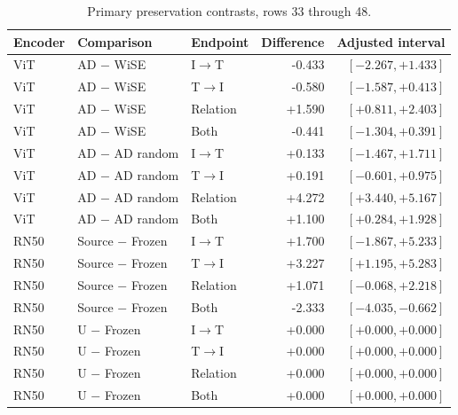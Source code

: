 \begin{table}[t]
\centering
\small
\setlength{\tabcolsep}{3pt}
\begin{tabular}{lllrr}
\toprule
Encoder & Comparison & Endpoint & Difference & Adjusted interval\\
\midrule
ViT & AD $-$ WiSE & I$\to$T & -0.433 & $[-2.267,+1.433]$ \\
ViT & AD $-$ WiSE & T$\to$I & -0.580 & $[-1.587,+0.413]$ \\
ViT & AD $-$ WiSE & Relation & +1.590 & $[+0.811,+2.403]$ \\
ViT & AD $-$ WiSE & Both & -0.441 & $[-1.304,+0.391]$ \\
ViT & AD $-$ AD random & I$\to$T & +0.133 & $[-1.467,+1.711]$ \\
ViT & AD $-$ AD random & T$\to$I & +0.191 & $[-0.601,+0.975]$ \\
ViT & AD $-$ AD random & Relation & +4.272 & $[+3.440,+5.167]$ \\
ViT & AD $-$ AD random & Both & +1.100 & $[+0.284,+1.928]$ \\
RN50 & Source $-$ Frozen & I$\to$T & +1.700 & $[-1.867,+5.233]$ \\
RN50 & Source $-$ Frozen & T$\to$I & +3.227 & $[+1.195,+5.283]$ \\
RN50 & Source $-$ Frozen & Relation & +1.071 & $[-0.068,+2.218]$ \\
RN50 & Source $-$ Frozen & Both & -2.333 & $[-4.035,-0.662]$ \\
RN50 & U $-$ Frozen & I$\to$T & +0.000 & $[+0.000,+0.000]$ \\
RN50 & U $-$ Frozen & T$\to$I & +0.000 & $[+0.000,+0.000]$ \\
RN50 & U $-$ Frozen & Relation & +0.000 & $[+0.000,+0.000]$ \\
RN50 & U $-$ Frozen & Both & +0.000 & $[+0.000,+0.000]$ \\
\bottomrule
\end{tabular}
\caption{Primary preservation contrasts, rows 33 through 48.}\label{tab:adprimary32}
\end{table}



